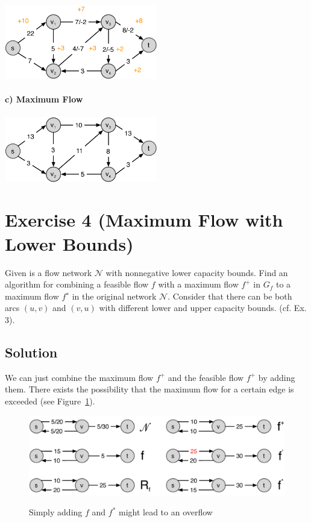 \documentclass[a4paper, 12pt]{report}
\begin{document}
\begin{center}
    \includegraphics[width=0.5\textwidth]{Figures/Exercise_2_3_b}
\end{center}

\paragraph{c) Maximum Flow}

\begin{center}
    \includegraphics[width=0.5\textwidth]{Figures/Exercise_2_3_c}
\end{center}

\section{Exercise 4 (Maximum Flow with Lower Bounds)}

Given is a flow network $𝒩$ with nonnegative lower capacity bounds. Find an
algorithm for combining a feasible flow $f$ with a maximum flow $f^+$ in $G_f$
to a maximum flow $f^∗$ in the original network $𝒩$. Consider that there can be
both arcs $(u, v)$ and $(v, u)$ with different lower and upper capacity bounds.
(cf. Ex. 3).

\subsection{Solution}

We can just combine the maximum flow $f^+$ and the feasible flow $f^+$ by
adding them. There exists the possibility that the maximum flow for a certain
edge is exceeded (see Figure~\ref{figure:Exercise_2_4_Counterexample}).

\begin{figure}[htbp]
    \caption{Simply adding $f$ and $f^*$ might lead to an overflow}
    \vskip 0.2cm
    \centering
    \includegraphics[width=\textwidth]{Figures/Exercise_2_4_Counterexample}
    \label{figure:Exercise_2_4_Counterexample}
\end{figure}
\end{document}
